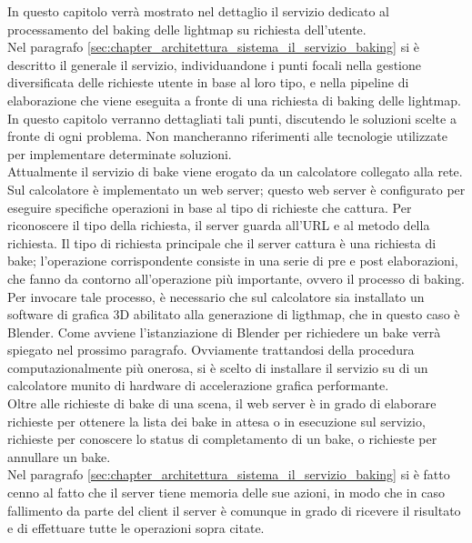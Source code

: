 In questo capitolo verrà mostrato nel dettaglio il servizio dedicato al processamento del baking delle lightmap su richiesta dell’utente. 
\\
Nel paragrafo \ref{sec:chapter_architettura_sistema_il_servizio_baking} si è descritto il generale il servizio, individuandone i punti focali nella gestione diversificata delle richieste utente in base al loro tipo, e nella pipeline di elaborazione che viene eseguita a fronte di una richiesta di baking delle lightmap. In questo capitolo verranno dettagliati tali punti, discutendo le soluzioni scelte a fronte di ogni problema. Non mancheranno riferimenti alle tecnologie utilizzate per implementare determinate soluzioni. 
\\
Attualmente il servizio di bake viene erogato da un calcolatore collegato alla rete.
Sul calcolatore è implementato un web server; questo web server è configurato per eseguire specifiche operazioni in base al tipo di richieste che cattura. Per riconoscere il tipo della richiesta, il server guarda all’URL e al metodo della richiesta. Il tipo di richiesta principale che il server cattura è una richiesta di bake; l’operazione corrispondente consiste in una serie di pre e post elaborazioni, che fanno da contorno all’operazione più importante, ovvero il processo di baking. Per invocare tale processo, è necessario che sul calcolatore sia installato un software di grafica 3D abilitato alla generazione di ligthmap, che in questo caso è Blender. Come avviene l’istanziazione di Blender per richiedere un bake verrà spiegato nel prossimo paragrafo. Ovviamente trattandosi della procedura computazionalmente più onerosa, si è scelto di installare il servizio su di un calcolatore munito di hardware di accelerazione grafica performante. 
\\
Oltre alle richieste di bake di una scena, il web server è in grado di elaborare richieste per ottenere la lista dei bake in attesa o in esecuzione sul servizio, richieste per conoscere lo status di completamento di un bake, o richieste per annullare un bake.
\\ 
Nel paragrafo \ref{sec:chapter_architettura_sistema_il_servizio_baking} si è fatto cenno al fatto che il server tiene memoria delle sue azioni, in modo che in caso fallimento da parte del client il server è comunque in grado di ricevere il risultato e di effettuare tutte le operazioni sopra citate.